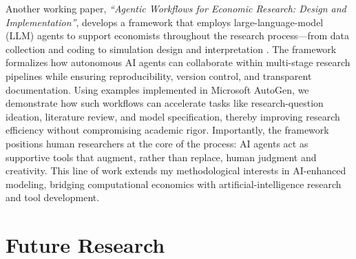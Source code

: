 \documentclass{nfr}
\begin{document}
Another working paper, \textit{``Agentic Workflows for Economic Research: Design and Implementation''}, develops a framework that employs large-language-model (LLM) agents to support economists throughout the research process—from data collection and coding to simulation design and interpretation \citep{Dawid2025}. The framework formalizes how autonomous AI agents can collaborate within multi-stage research pipelines while ensuring reproducibility, version control, and transparent documentation. Using examples implemented in Microsoft AutoGen, we demonstrate how such workflows can accelerate tasks like research-question ideation, literature review, and model specification, thereby improving research efficiency without compromising academic rigor. Importantly, the framework positions human researchers at the core of the process: AI agents act as supportive tools that augment, rather than replace, human judgment and creativity. This line of work extends my methodological interests in AI-enhanced modeling, bridging computational economics with artificial-intelligence research and tool development.

\section*{Future Research}



\end{document}
